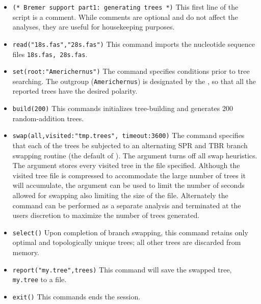 \begin{itemize}
\item \texttt{(* Bremer support part1: generating trees *)} This first line of the script is a comment. While comments
 are optional and do not affect the analyses, they are useful for housekeeping purposes. 
\item \texttt{read("18s.fas","28s.fas")} This command imports the nucleotide sequence files \texttt{18s.fas, 
28s.fas}.
\item \texttt{set(root:"Americhernus")} The  command specifies conditions prior to tree 
searching. The outgroup (\texttt{Americhernus}) is designated by the , so that all the reported 
trees have the desired polarity.     
\item \texttt{build(200)} This commands initializes tree-building and generates 200 random-addition trees.      
\item \texttt{swap(all,visited:"tmp.trees", timeout:3600)} The  command specifies that each of 
the trees be subjected to an alternating SPR and TBR branch swapping routine (the default of \poy).  The 
 argument turns off all swap heuristics. The  argument stores 
every visited tree in the file specified.  Although the visited tree file is compressed to accommodate the large 
number of trees it will accumulate, the argument  can be used to limit the number of 
seconds allowed for swapping also limiting the size of the file.  Alternately  the   command 
can be performed as a separate analysis and terminated at the users discretion to maximize the number of trees 
generated.
\item \texttt{select()} Upon completion of branch swapping, this command retains only optimal and topologically
 unique trees; all other trees are discarded from memory. 
\item \texttt{report("my.tree",trees)} This command will save the swapped tree, \\ \texttt{my.tree} to a file. 
\item \texttt{exit()} This commands ends the \poy session.


\end{itemize}
